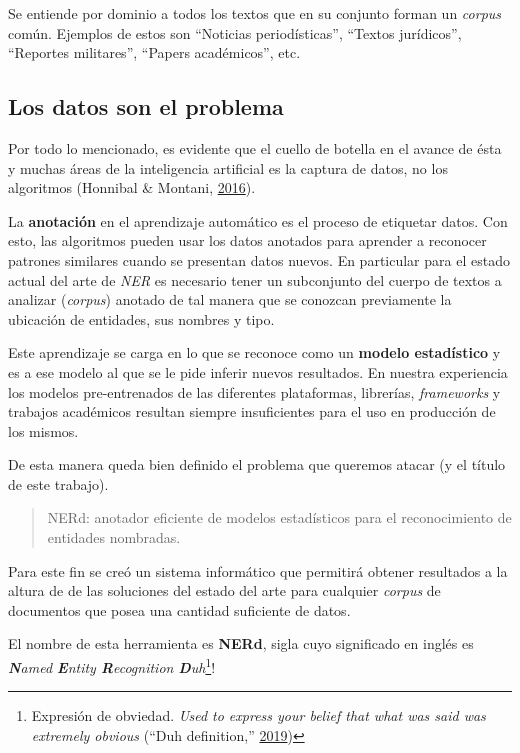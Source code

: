 \documentclass[12pt,a4paper,]{scrartcl}
\begin{document}
Se entiende por dominio a todos los textos que en su conjunto forman un \emph{corpus} común. Ejemplos de estos son \enquote{Noticias periodísticas}, \enquote{Textos jurídicos}, \enquote{Reportes militares}, \enquote{Papers académicos}, etc.

\hypertarget{los-datos-son-el-problema}{%
\subsection{Los datos son el problema}\label{los-datos-son-el-problema}}

Por todo lo mencionado, es evidente que el cuello de botella en el avance de ésta y muchas áreas de la inteligencia artificial es la captura de datos, no los algoritmos (Honnibal \& Montani, \protect\hyperlink{ref-montani_AI}{2016}).

La \textbf{anotación} en el aprendizaje automático es el proceso de etiquetar datos. Con esto, las algoritmos pueden usar los datos anotados para aprender a reconocer patrones similares cuando se presentan datos nuevos. En particular para el estado actual del arte de \emph{NER} es necesario tener un subconjunto del cuerpo de textos a analizar (\emph{corpus}) anotado de tal manera que se conozcan previamente la ubicación de entidades, sus nombres y tipo.

Este aprendizaje se carga en lo que se reconoce como un \textbf{modelo estadístico} y es a ese modelo al que se le pide inferir nuevos resultados. En nuestra experiencia los modelos pre-entrenados de las diferentes plataformas, librerías, \emph{frameworks} y trabajos académicos resultan siempre insuficientes para el uso en producción de los mismos.

De esta manera queda bien definido el problema que queremos atacar (y el título de este trabajo).

\begin{quote}
NERd: anotador eficiente de modelos estadísticos para el reconocimiento de entidades nombradas.
\end{quote}

Para este fin se creó un sistema informático que permitirá obtener resultados a la altura de de las soluciones del estado del arte para cualquier \emph{corpus} de documentos que posea una cantidad suficiente de datos.

El nombre de esta herramienta es \textbf{NERd}, sigla cuyo significado en inglés es \emph{\textbf{N}amed \textbf{E}ntity \textbf{R}ecognition \textbf{D}uh}\footnote{Expresión de obviedad. \emph{Used to express your belief that what was said was extremely obvious} (``Duh definition,'' \protect\hyperlink{ref-cambridge_duh}{2019})}!
\end{document}
